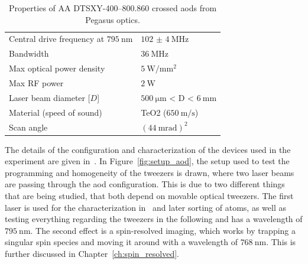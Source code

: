 \begin{table}[h]%
\label{tbl:pegasus_aod}
\centering
\begin{tabular}{l l}
	\toprule \toprule
	Central drive frequency at $\SI{795}{\nano\meter}$ & $\SI{102(4)}{\mega\hertz}$ \\
	Bandwidth & $\SI{36}{\mega\hertz}$ \\
	Max optical power density & $\SI{5}{\watt\per\milli\meter\squared}$ \\
	Max RF power & $\SI{2}{\watt}$ \\
	Laser beam diameter [$D$] & $\SI{500}{\micro\meter}$ < D < $\SI{6}{\milli\meter}$ \\
	Material (speed of sound) & TeO2 ($\SI{650}{\meter\per\second}$) \\
	Scan angle & ${(\SI{44}{\milli\radian})}^2$ \\
	\bottomrule \bottomrule
\end{tabular}
\caption{Properties of AA DTSXY-400--800.860 crossed \acp{aod} from Pegasus optics.}
\end{table}

\begin{figure}[ht]%
\end{figure}

The details of the configuration and characterization of the devices used in the experiment are given in~\cite{Osterholz2020}.
In Figure~\ref{fig:setup_aod}, the setup used to test the programming and homogeneity of the tweezers is drawn, where two laser beams are passing through the \ac{aod} configuration. This is due to two different things that are being studied, that both depend on movable optical tweezers. The first laser is used for the characterization in~\cite{Osterholz2020} and later sorting of atoms, as well as testing everything regarding the tweezers in the following and has a wavelength of $\SI{795}{\nano\meter}$. The second effect is a spin-resolved imaging, which works by trapping a singular spin species and moving it around with a wavelength of $\SI{768}{\nano\meter}$. This is further discussed in Chapter~\ref{ch:spin_resolved}.

